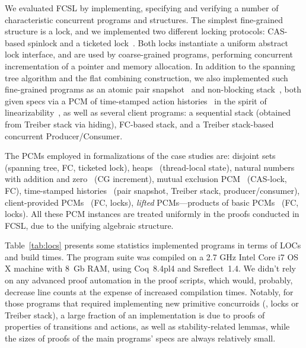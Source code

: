 We evaluated FCSL by implementing, specifying and verifying a number
of characteristic concurrent programs and structures. The simplest
fine-grained structure is a lock, and we implemented two different
locking protocols: CAS-based spinlock and a ticketed
lock~\cite{DinsdaleYoung-al:ECOOP10}. Both locks instantiate a uniform
abstract lock interface, and are used by coarse-grained programs,
performing concurrent incrementation of a pointer and memory
allocation. In addition to the spanning tree algorithm and the flat
combining construction, we also implemented such fine-grained programs
as an atomic pair snapshot~\cite{Qadeer-al:TR09,Liang-Feng:PLDI13} and
non-blocking stack~\cite{Treiber:TR}, both given specs via a PCM of
time-stamped action histories~\cite{Sergey-al:ESOP15} in the spirit of
linearizability~\cite{Herlihy-Wing:TOPLAS90}, as well as several
client programs: a sequential stack (obtained from Treiber stack via
hiding), FC-based stack, and a Treiber stack-based concurrent
Producer/Consumer.

The PCMs employed in formalizations of the case studies are:
%
disjoint sets~\cite{Nanevski-al:ESOP14} (spanning tree, FC, ticketed
lock),
%
heaps~\cite{LeyWild-Nanevski:POPL13} (thread-local
state),
%
natural numbers with addition and zero~\cite{LeyWild-Nanevski:POPL13}
(CG increment),
%
mutual exclusion PCM~\cite{LeyWild-Nanevski:POPL13,Nanevski-al:ESOP14}
(CAS-lock, FC),
%
time-stamped histories~\cite{Sergey-al:ESOP15} (pair snapshot, Treiber
stack, producer/consumer),
%
client-provided PCMs~\cite{LeyWild-Nanevski:POPL13,Nanevski-al:ESOP14}
(FC, locks),
%
\emph{lifted} PCMs---products of basic
PCMs~\cite{LeyWild-Nanevski:POPL13,Nanevski-al:ESOP14} (FC, locks).
%
All these PCM instances are treated uniformly in the proofs
conducted in FCSL, due to the unifying algebraic structure.



Table~\ref{tab:locs} presents some statistics \wrt implemented
programs in terms of LOCs and build times.  The program suite was
compiled on a 2.7 GHz Intel Core i7 OS X machine with 8~Gb RAM, using
Coq~8.4pl4 and Ssreflect~1.4.
%
We didn't rely on any advanced proof automation in the proof scripts,
which would, probably, decrease line counts at the expense of
increased compilation times. Notably, for those programs that required
implementing new primitive concurroids (\eg, locks or Treiber stack),
a large fraction of an implementation is due to proofs of properties
of transitions and actions, as well as stability-related lemmas, while
the sizes of proofs of the main programs' specs are always relatively
small.

